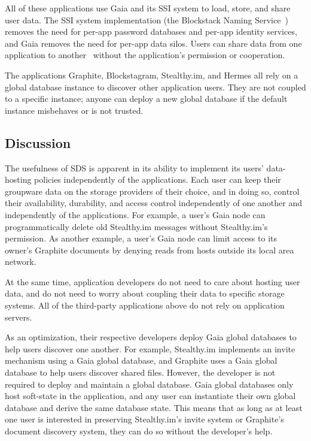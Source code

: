 All of these applications use Gaia and its SSI system to load, store, and share
user data.  The SSI system implementation (the Blockstack Naming
Service~\cite{bns}) removes the need for per-app password databases and per-app
identity services, and Gaia removes the need for per-app data silos.  Users can
share data from one application to
another~\cite{blockstack-technical-faq-share-data} without the application's
permission or cooperation.

The applications Graphite, Blockstagram, Stealthy.im, and Hermes all rely on a
global database instance to discover other application users.  They are not
coupled to a specific instance; anyone can deploy a new global database if the
default instance misbehaves or is not trusted.

\subsection{Discussion}

The usefulness of SDS is apparent in its ability to implement its users'
data-hosting policies independently of the applications.  Each user can keep their groupware data on
the storage providers of their choice, and in doing so, control their
availability, durability, and access control independently of one another and independently of
the applications.  For example, a user's Gaia node can programmatically delete
old Stealthy.im messages without Stealthy.im's permission.  As another example,
a user's Gaia node can limit access to its owner's Graphite documents by denying
reads from hosts outside its local area network.

At the same time, application developers do not need to care
about hosting user data, and do not need to worry about coupling their data to
specific storage systems.  All of the third-party applications above do not rely
on application servers.

As an optimization, their respective developers deploy
Gaia global databases to help users discover one another.  For example,
Stealthy.im implements an invite mechanism using a Gaia global database, and
Graphite uses a Gaia global database to help users discover shared files.
However, the developer is not required to deploy and maintain a global database.
Gaia global databases only host soft-state in the application, and any user can
instantiate their own global database and derive the same 
database state.  This means that as long as at least one user is interested in
preserving Stealthy.im's invite system or Graphite's
document discovery system, they can do so without the developer's help.

